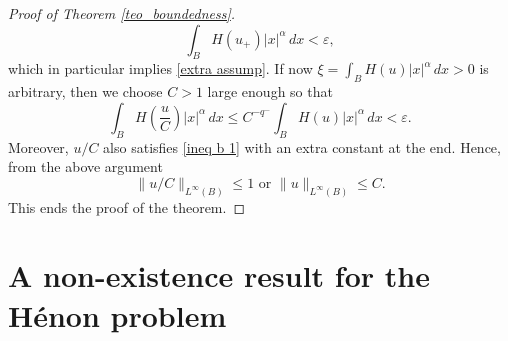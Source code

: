 \documentclass[leqno,twoside, 12pt]{amsart}
\theoremstyle{plain}
\numberwithin{equation}{section} \numberwithin{figure}{section}
\theoremstyle{definition}
\numberwithin{equation}{section}
\begin{document}
\begin{proof}[Proof of Theorem \ref{teo_boundedness}]
 $$\int_B H(u_{+})|x|^\alpha\,dx<\varepsilon,$$which in particular implies \eqref{extra assump}. If now
 $\xi=\int_B H(u)|x|^{\alpha}\,dx>0$ is arbitrary, then we choose  $C>1$ large enough so that
 \begin{equation}
 \int_B H\left(\dfrac{u}{C}\right)|x|^{\alpha}\,dx \leq C^{-q^{-}}\int_B H(u)|x|^{\alpha}\,dx<\varepsilon.
 \end{equation}Moreover, $u/C$ also satisfies \eqref{ineq b 1} with an extra constant at the end. Hence, from the above argument 
 $$\|u/C\|_{L^{\infty}(B)}\leq 1 \text{ or }\|u\|_{L^{\infty}(B)}\leq C.$$This ends the proof of the theorem.
\end{proof}
 



\section{A non-existence result for the H\'enon problem } \label{sec.no.exist}
\end{document}
